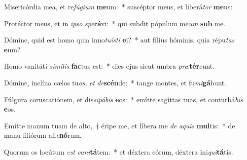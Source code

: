 \item Misericórdia mea, et re\textit{fú}\textit{gi}\textit{um} \textbf{me}um:~* suscéptor meus, et liberá\textit{tor} \textbf{me}us:
\item Protéctor meus, et in \textit{ip}\textit{so} \textit{spe}\textbf{rá}vi:~* qui subdit pópulum me\textit{um} \textbf{sub} me.
\item Dómine, quid est homo quia inno\textit{tu}\textit{ís}\textit{ti} \textbf{e}i?~* aut fílius hóminis, quia répu\textit{tas} \textbf{e}um?
\item Homo vanitáti \textit{sí}\textit{mi}\textit{lis} \textbf{fac}tus est:~* dies ejus sicut umbra \textit{præ}\textbf{tér}eunt.
\item Dómine, inclína cælos tu\textit{os}, \textit{et} \textit{de}\textbf{scén}de:~* tange montes, et fu\textit{mi}\textbf{gá}bunt.
\item Fúlgura coruscatiónem, et dis\textit{si}\textit{pá}\textit{bis} \textbf{e}os:~* emítte sagíttas tuas, et conturbá\textit{bis} \textbf{e}os.
\item Emítte manum tuam de alto,~† éripe me, et líbera me \textit{de} \textit{a}\textit{quis} \textbf{mul}tis:~* de manu filiórum ali\textit{e}\textbf{nó}rum.
\item Quorum os locútum \textit{est} \textit{va}\textit{ni}\textbf{tá}tem:~* et déxtera eórum, déxtera ini\textit{qui}\textbf{tá}tis.
